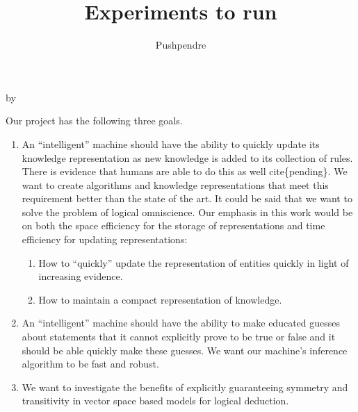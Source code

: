 \documentclass[12pt,answers]{exam} %
\title{Experiments to run}
\author{Pushpendre}
\makeatletter
\renewcommand{\cite}[1]{cite\{#1\}}
\def\SetTotalwidth{\advance\linewidth by \@totalleftmargin
\@totalleftmargin=0pt}
\newcommand{\answer}[1]{
\ifprintanswers
\SetTotalwidth
  \begin{solution}[0in]#1\end{solution}
\else \fi
}
\makeatother
\begin{document}
\maketitle
\begin{questions}
  \answer{Our project has the following three goals.
    \begin{enumerate}
    \item An ``intelligent'' machine should have the ability to
      quickly update its knowledge representation as new knowledge is
      added to its collection of rules. There is evidence that humans
      are able to do this as well \cite{pending}. We want to create
      algorithms and knowledge representations that meet this
      requirement better than the state of the art. It could be said
      that we want to solve the problem of logical omniscience. Our
      emphasis in this work would be on both the space efficiency for
      the storage of representations and time efficiency for updating
      representations:
      \begin{enumerate}
      \item How to ``quickly'' update the representation of entities
        quickly in light of increasing evidence.
      \item How to maintain a compact representation of knowledge.
      \end{enumerate}
    \item An ``intelligent'' machine should have the ability to make
      educated guesses about statements that it cannot explicitly
      prove to be true or false and it should be able quickly make
      these guesses. We want our machine's inference algorithm to be
      fast and robust.
    \item We want to investigate the benefits of explicitly
      guaranteeing symmetry and transitivity in vector space based
      models for logical deduction.
    \end{enumerate} }


\end{questions}
\end{document}
